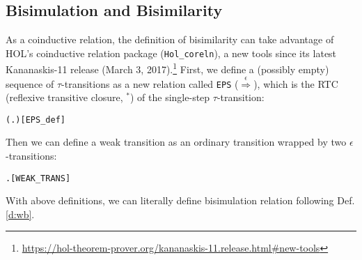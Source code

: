 
\subsection{Bisimulation and Bisimilarity}

As a coinductive relation, the definition of bisimilarity can take
advantage of HOL's coinductive relation package (\texttt{Hol_coreln}),
a new tools since its latest Kananaskis-11 release (March 3,
2017).\footnote{\url{https://hol-theorem-prover.org/kananaskis-11.release.html\#new-tools}}
First, we define a (possibly empty) sequence of $\tau$-transitions as
a new relation called \texttt{EPS} ($\overset{\epsilon}{\Rightarrow}$), which is the RTC
(reflexive transitive closure, $^*$) of the single-step $\tau$-transition:
\begin{alltt}
 \HOLSymConst{=} (\HOLTokenLambda{} .  \HOLTokenTransBegin\HOLSymConst{\ensuremath{\tau}}\HOLTokenTransEnd {})\HOLSymConst{\HOLTokenSupStar{}}\hfill{[EPS_def]}
\end{alltt}
Then we can define a weak transition as an ordinary transition wrapped by
two $\epsilon$-transitions:
\begin{alltt}
 \HOLTokenWeakTransBegin{}\HOLTokenWeakTransEnd {} \HOLSymConst{\HOLTokenEquiv{}} \HOLSymConst{\HOLTokenExists{}} .  \HOLSymConst{\HOLTokenEPS}  \HOLSymConst{\HOLTokenConj{}}  \HOLTokenTransBegin{}\HOLTokenTransEnd {} \HOLSymConst{\HOLTokenConj{}}  \HOLSymConst{\HOLTokenEPS} \hfill{[WEAK_TRANS]}
\end{alltt}
With above definitions, we can literally define bisimulation relation following Def.\;\ref{d:wb}.

